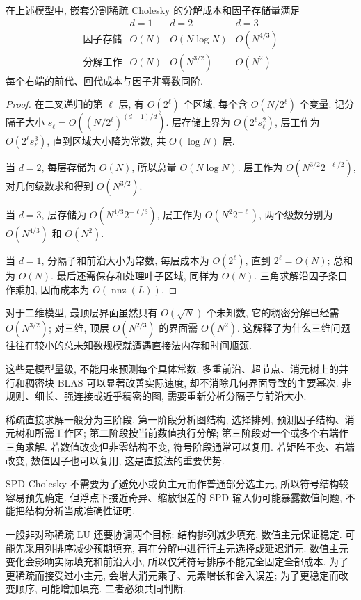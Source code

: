 \begin{proposition}[网格模型下的嵌套分割成本]\label{prop:nested-dissection-cost}
在上述模型中, 嵌套分割稀疏 Cholesky 的分解成本和因子存储量满足
\[
\begin{array}{c|ccc}
&d=1&d=2&d=3\\\hline
\text{因子存储}&O(N)&O(N\log N)&O(N^{4/3})\\
\text{分解工作}&O(N)&O(N^{3/2})&O(N^2)
\end{array}
\]
每个右端的前代、回代成本与因子非零数同阶.
\end{proposition}
\begin{proof}
在二叉递归的第 $\ell$ 层, 有 $O(2^\ell)$ 个区域, 每个含 $O(N/2^\ell)$ 个变量. 记分隔子大小
$s_\ell=O((N/2^\ell)^{(d-1)/d})$. 层存储上界为 $O(2^\ell s_\ell^2)$, 层工作为 $O(2^\ell s_\ell^3)$, 直到区域大小降为常数, 共 $O(\log N)$ 层.

当 $d=2$, 每层存储为 $O(N)$, 所以总量 $O(N\log N)$. 层工作为 $O(N^{3/2}2^{-\ell/2})$, 对几何级数求和得到 $O(N^{3/2})$.

当 $d=3$, 层存储为 $O(N^{4/3}2^{-\ell/3})$, 层工作为 $O(N^2 2^{-\ell})$, 两个级数分别为 $O(N^{4/3})$ 和 $O(N^2)$.

当 $d=1$, 分隔子和前沿大小为常数, 每层成本为 $O(2^\ell)$, 直到 $2^\ell=O(N)$; 总和为 $O(N)$. 最后还需保存和处理叶子区域, 同样为 $O(N)$. 三角求解沿因子条目作乘加, 因而成本为 $O(\operatorname{nnz}(L))$.
\end{proof}
对于二维模型, 最顶层界面虽然只有 $O(\sqrt N)$ 个未知数, 它的稠密分解已经需 $O(N^{3/2})$; 对三维, 顶层 $O(N^{2/3})$ 的界面需 $O(N^2)$. 这解释了为什么三维问题往往在较小的总未知数规模就遭遇直接法内存和时间瓶颈.

这些是模型量级, 不能用来预测每个具体常数. 多重前沿、超节点、消元树上的并行和稠密块 BLAS 可以显著改善实际速度, 却不消除几何界面导致的主要幂次. 非规则、细长、强连接或近乎稠密的图, 需要重新分析分隔子与前沿大小.

稀疏直接求解一般分为三阶段. 第一阶段分析图结构, 选择排列, 预测因子结构、消元树和所需工作区; 第二阶段按当前数值执行分解; 第三阶段对一个或多个右端作三角求解. 若数值改变但非零结构不变, 符号阶段通常可以复用. 若矩阵不变、右端改变, 数值因子也可以复用, 这是直接法的重要优势.

SPD Cholesky 不需要为了避免小或负主元而作普通部分选主元, 所以符号结构较容易预先确定. 但浮点下接近奇异、缩放很差的 SPD 输入仍可能暴露数值问题, 不能把结构分析当成准确性证明.

一般非对称稀疏 LU 还要协调两个目标: 结构排列减少填充, 数值主元保证稳定. 可能先采用列排序减少预期填充, 再在分解中进行行主元选择或延迟消元. 数值主元变化会影响实际填充和前沿大小, 所以仅凭符号排序不能完全固定全部成本. 为了更稀疏而接受过小主元, 会增大消元乘子、元素增长和舍入误差; 为了更稳定而改变顺序, 可能增加填充. 二者必须共同判断.

